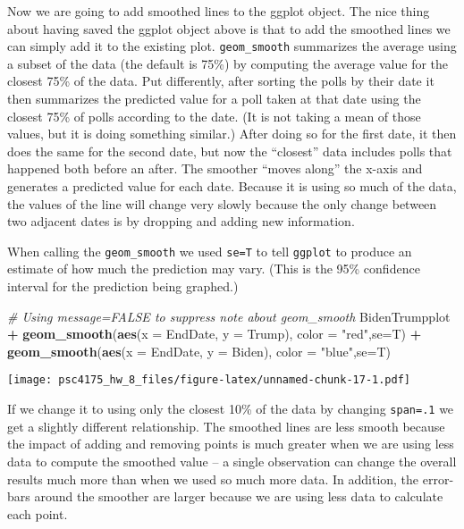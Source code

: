 \documentclass[
]{article}
\newenvironment{Shaded}{\begin{snugshade}}{\end{snugshade}}
\newcommand{\AttributeTok}[1]{\textcolor[rgb]{0.13,0.29,0.53}{#1}}
\newcommand{\CommentTok}[1]{\textcolor[rgb]{0.56,0.35,0.01}{\textit{#1}}}
\newcommand{\FunctionTok}[1]{\textcolor[rgb]{0.13,0.29,0.53}{\textbf{#1}}}
\newcommand{\NormalTok}[1]{#1}
\newcommand{\SpecialCharTok}[1]{\textcolor[rgb]{0.81,0.36,0.00}{\textbf{#1}}}
\newcommand{\StringTok}[1]{\textcolor[rgb]{0.31,0.60,0.02}{#1}}
\begin{document}
Now we are going to add smoothed lines to the ggplot object. The nice
thing about having saved the ggplot object above is that to add the
smoothed lines we can simply add it to the existing plot.
\texttt{geom\_smooth} summarizes the average using a subset of the data
(the default is 75\%) by computing the average value for the closest
75\% of the data. Put differently, after sorting the polls by their date
it then summarizes the predicted value for a poll taken at that date
using the closest 75\% of polls according to the date. (It is not taking
a mean of those values, but it is doing something similar.) After doing
so for the first date, it then does the same for the second date, but
now the ``closest'' data includes polls that happened both before an
after. The smoother ``moves along'' the x-axis and generates a predicted
value for each date. Because it is using so much of the data, the values
of the line will change very slowly because the only change between two
adjacent dates is by dropping and adding new information.

When calling the \texttt{geom\_smooth} we used \texttt{se=T} to tell
\texttt{ggplot} to produce an estimate of how much the prediction may
vary. (This is the 95\% confidence interval for the prediction being
graphed.)

\begin{Shaded}
\begin{Highlighting}[]
\CommentTok{\# Using message=FALSE to suppress note about geom\_smooth}
\NormalTok{BidenTrumpplot }\SpecialCharTok{+}  
  \FunctionTok{geom\_smooth}\NormalTok{(}\FunctionTok{aes}\NormalTok{(}\AttributeTok{x =}\NormalTok{ EndDate, }\AttributeTok{y =}\NormalTok{ Trump), }
              \AttributeTok{color =} \StringTok{"red"}\NormalTok{,}\AttributeTok{se=}\NormalTok{T) }\SpecialCharTok{+} 
  \FunctionTok{geom\_smooth}\NormalTok{(}\FunctionTok{aes}\NormalTok{(}\AttributeTok{x =}\NormalTok{ EndDate, }\AttributeTok{y =}\NormalTok{ Biden), }
              \AttributeTok{color =} \StringTok{"blue"}\NormalTok{,}\AttributeTok{se=}\NormalTok{T)}
\end{Highlighting}
\end{Shaded}

\texttt{[image: psc4175\_hw\_8\_files/figure-latex/unnamed-chunk-17-1.pdf]}

If we change it to using only the closest 10\% of the data by changing
\texttt{span=.1} we get a slightly different relationship. The smoothed
lines are less smooth because the impact of adding and removing points
is much greater when we are using less data to compute the smoothed
value -- a single observation can change the overall results much more
than when we used so much more data. In addition, the error-bars around
the smoother are larger because we are using less data to calculate each
point.
\end{document}
